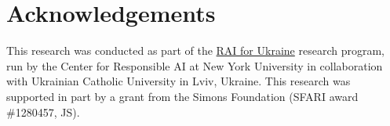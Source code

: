 \section{Acknowledgements}
\label{sec:ack}

This research was conducted as part of the \href{https://r-ai.co/ukraine}{RAI for Ukraine} research program, run by the Center for Responsible AI at New York University in collaboration with Ukrainian Catholic University in Lviv, Ukraine.   This research was supported in part by a grant from the Simons Foundation (SFARI award \#1280457, JS).
